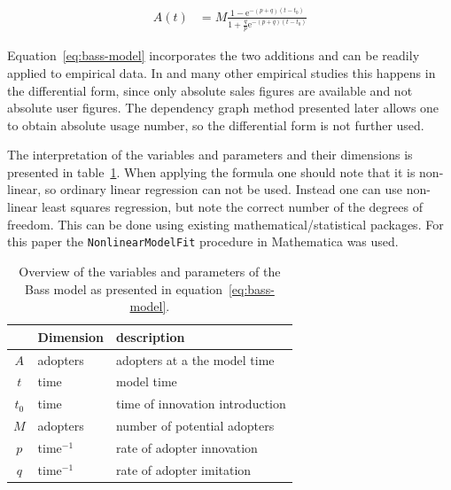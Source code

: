 \documentclass[smallextended,final]{svjour3}
\newcommand{\e}{\mathrm{e}}
\begin{document}
\begin{align} \label{eq:bass-model}
	A(t) &= M \frac{1 - \e^{-(p+q)(t-t_0)}}{1 + \frac{q}{p}\e^{-(p+q)(t-t_0)}}
\end{align}

Equation~\eqref{eq:bass-model} incorporates the two additions and can be readily applied to empirical data. In \cite{mahajan95} and many other empirical studies this happens in the differential form, since only absolute sales figures are available and not absolute user figures. The dependency graph method presented later allows one to obtain absolute usage number, so the differential form is not further used. 

The interpretation of the variables and parameters and their dimensions is presented in table~\ref{tbl:bass-model}. When applying the formula one should note that it is non-linear, so ordinary linear regression can not be used. Instead one can use non-linear least squares regression, but note the correct number of the degrees of freedom. This can be done using existing mathematical/statistical packages. For this paper the \verb|NonlinearModelFit| procedure in Mathematica was used. 

\begin{table}
\centering\small
\caption[Bass model variables and parameters]{Overview of the variables and parameters of the Bass model as presented in equation~\eqref{eq:bass-model}.}
\label{tbl:bass-model}
\begin{tabular}{cll}
\toprule
& Dimension & description \\
\midrule
$A$   & adopters    & adopters at a the model time \\
$t$   & time        & model time \\
\midrule
$t_0$ & time        & time of innovation introduction \\
$M$   & adopters    & number of potential adopters \\
$p$   & time$^{-1}$ & rate of adopter innovation \\
$q$   & time$^{-1}$ & rate of adopter imitation \\
\bottomrule
\end{tabular}
\end{table}
\end{document}
